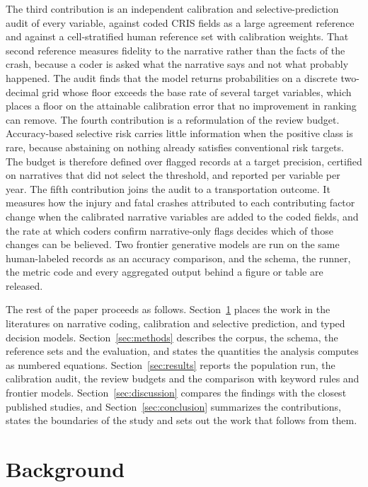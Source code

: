 The third contribution is an independent calibration and selective-prediction audit of every
variable, against coded CRIS fields as a large agreement reference and against a
cell-stratified human reference set with calibration weights. That second reference measures
fidelity to the narrative rather than the facts of the crash, because a coder is asked what the
narrative says and not what probably happened. The audit finds that the model returns
probabilities on a discrete two-decimal grid whose floor exceeds the base rate of several
target variables, which places a floor on the attainable calibration error that no improvement
in ranking can remove. The fourth contribution is a reformulation of the review budget.
Accuracy-based selective risk carries little information when the positive class is rare,
because abstaining on nothing already satisfies conventional risk targets. The budget is
therefore defined over flagged records at a target precision, certified on narratives that did
not select the threshold, and reported per variable per year. The fifth contribution joins the
audit to a transportation outcome. It measures how the injury and fatal crashes attributed to
each contributing factor change when the calibrated narrative variables are added to the coded
fields, and the rate at which coders confirm narrative-only flags decides which of those
changes can be believed. Two frontier generative models are run on the same human-labeled
records as an accuracy comparison, and the schema, the runner, the metric code and every
aggregated output behind a figure or table are released.

The rest of the paper proceeds as follows. Section~\ref{sec:background} places the work in
the literatures on narrative coding, calibration and selective prediction, and typed decision
models. Section~\ref{sec:methods} describes the corpus, the schema, the reference sets and
the evaluation, and states the quantities the analysis computes as numbered equations.
Section~\ref{sec:results} reports the population run, the calibration audit, the review
budgets and the comparison with keyword rules and frontier models. Section~\ref{sec:discussion}
compares the findings with the closest published studies, and Section~\ref{sec:conclusion}
summarizes the contributions, states the boundaries of the study and sets out the work that
follows from them.

\section{Background}
\label{sec:background}

